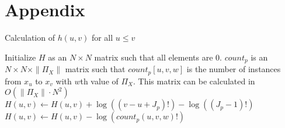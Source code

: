 





\section*{Appendix}

\begin{algorithm}
  \caption{ Calculation of $h(u,v)$ for all $u \leq v$}
  \label{alg:h}
  \begin{algorithmic}[1]
  \State Initialize $H$ as an $N \times N$ matrix such that all elements are 0.
  \State $count_p$ is an $N \times N \times \|\Pi_X\|$ matrix such that $count_p [u,v,w]$ is the number of instances from $x_u$ to $x_v$ with $w$th value of $\Pi_X$. This matrix can be calculated in $O(\|\Pi_X\| \cdot N^2)$
      \State $H(u,v) \leftarrow H(u,v) + \log((v-u + J_p)!) - \log((J_p -1)!)$
        \State $H(u,v) \leftarrow H(u,v) - \log( count_p(u,v,w)!)$
      \EndFor
    \EndFor
  \EndFor
    \State {}
  \EndFor
  \end{algorithmic}
\end{algorithm}



